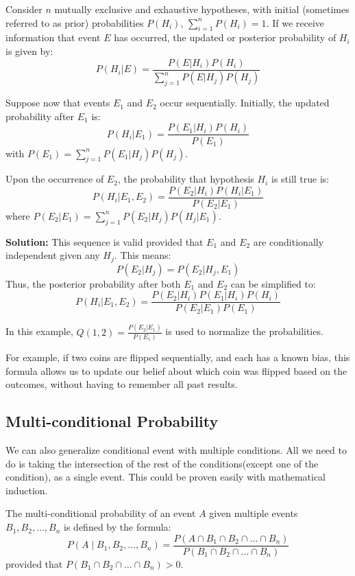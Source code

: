 \begin{example}
    Consider $n$ mutually exclusive and exhaustive hypotheses, with initial (sometimes referred to as prior) probabilities $P(H_i)$, $\sum_{i=1}^n P(H_i) = 1$. If we receive information that event $E$ has occurred, the updated or posterior probability of $H_i$ is given by:
    \[
    P(H_i|E) = \frac{P(E|H_i)P(H_i)}{\sum_{j=1}^n P(E|H_j)P(H_j)}
    \]
    
    Suppose now that events $E_1$ and $E_2$ occur sequentially. Initially, the updated probability after $E_1$ is:
    \[
    P(H_i|E_1) = \frac{P(E_1|H_i)P(H_i)}{P(E_1)}
    \]
    with $P(E_1) = \sum_{j=1}^n P(E_1|H_j)P(H_j)$.
    
    Upon the occurrence of $E_2$, the probability that hypothesis $H_i$ is still true is:
    \[
    P(H_i|E_1, E_2) = \frac{P(E_2|H_i)P(H_i|E_1)}{P(E_2|E_1)}
    \]
    where $P(E_2|E_1) = \sum_{j=1}^n P(E_2|H_j)P(H_j|E_1)$.
    
    \textbf{Solution:} This sequence is valid provided that $E_1$ and $E_2$ are conditionally independent given any $H_j$. This means:
    \[
    P(E_2|H_j) = P(E_2|H_j, E_1)
    \]
    Thus, the posterior probability after both $E_1$ and $E_2$ can be simplified to:
    \[
    P(H_i|E_1, E_2) = \frac{P(E_2|H_i)P(E_1|H_i)P(H_i)}{P(E_2|E_1)P(E_1)}
    \]
    
    In this example, $Q(1,2) = \frac{P(E_2|E_1)}{P(E_1)}$ is used to normalize the probabilities.
    
    For example, if two coins are flipped sequentially, and each has a known bias, this formula allows us to update our belief about which coin was flipped based on the outcomes, without having to remember all past results.
    
    \end{example}
    \subsection{Multi-conditional Probability}
    We can also generalize conditional event with multiple conditions. All we need to do is taking 
    the intersection of the rest of the conditions(except one of the condition), as a single event.
    This could be proven easily with mathematical induction.
\begin{definition}
	The multi-conditional probability of an event \( A \) given multiple events \( B_1, B_2, \ldots, B_n \) is defined by the formula:
	\[
	P(A \mid B_1, B_2, \ldots, B_n) = \frac{P(A \cap B_1 \cap B_2 \cap \ldots \cap B_n)}{P(B_1 \cap B_2 \cap \ldots \cap B_n)}
	\]
	provided that \( P(B_1 \cap B_2 \cap \ldots \cap B_n) > 0 \).
	
\end{definition}

